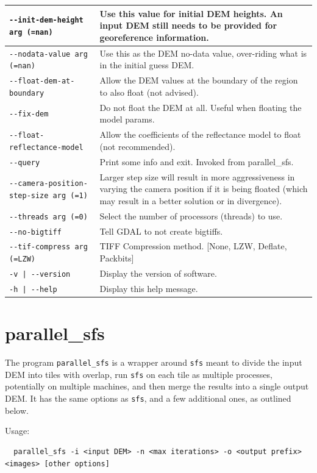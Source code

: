 \begin{longtable}{|l|p{7.5cm}|}
\texttt{-\/-init-dem-height arg (=nan)} & Use this value for initial DEM heights. An input DEM still needs to be provided for georeference information.\\ \hline
\texttt{-\/-nodata-value arg (=nan)} & Use this as the DEM no-data value, over-riding what is in the initial guess DEM.\\ \hline
\texttt{-\/-float-dem-at-boundary} & Allow the DEM values at the boundary of the region to also float (not advised).\\ \hline
\texttt{-\/-fix-dem} & Do not float the DEM at all. Useful when floating the model params.\\ \hline
\texttt{-\/-float-reflectance-model} & Allow the coefficients of the reflectance model to float (not recommended).\\ \hline
\texttt{-\/-query} & Print some info and exit. Invoked from parallel\_sfs.\\ \hline
\texttt{-\/-camera-position-step-size arg (=1)} & Larger step size will result in more aggressiveness in varying the camera position if it is being floated (which may result in a better solution or in divergence).\\ \hline
\texttt{-\/-threads arg (=0)} & Select the number of processors (threads) to use.\\ \hline
\texttt{-\/-no-bigtiff} & Tell GDAL to not create bigtiffs.\\ \hline
\texttt{-\/-tif-compress arg (=LZW)} & TIFF Compression method. [None, LZW, Deflate, Packbits]\\ \hline
\texttt{-v | -\/-version } & Display the version of software.\\ \hline
\texttt{-h | -\/-help } & Display this help message.\\ \hline
\end{longtable}

\section{parallel\_sfs}
\label{psfs}

The program \texttt{parallel\_sfs} is a wrapper around \texttt{sfs}
meant to divide the input DEM into tiles with overlap, run \texttt{sfs} 
on each tile as multiple processes, potentially on multiple machines,
and then merge the results into a single output DEM. It has the same
options as \texttt{sfs}, and a few additional ones, as outlined below.

Usage:
\begin{verbatim}
  parallel_sfs -i <input DEM> -n <max iterations> -o <output prefix> <images> [other options]
\end{verbatim}


